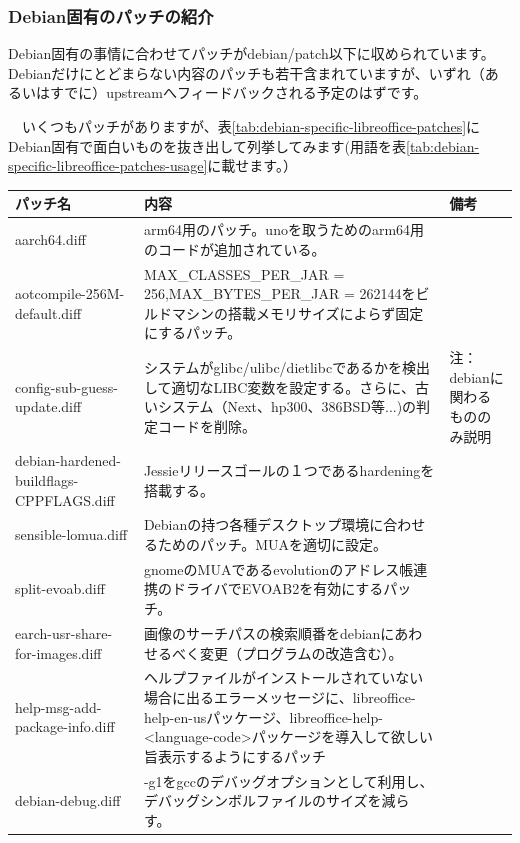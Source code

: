 \documentclass[mingoth,a4paper]{jsarticle}
\begin{document}
\subsubsection{Debian固有のパッチの紹介}

 Debian固有の事情に合わせてパッチがdebian/patch以下に収められています。Debianだけにとどまらない内容のパッチも若干含まれていますが、いずれ（あるいはすでに）upstreamへフィードバックされる予定のはずです。

　いくつもパッチがありますが、表\ref{tab:debian-specific-libreoffice-patches}にDebian固有で面白いものを抜き出して列挙してみます(用語を表\ref{tab:debian-specific-libreoffice-patches-usage}に載せます。）

\begin{table}[ht!]
\begin{center}
{\small{
\begin{tabular}{|l|p{7cm}|p{3cm}|}
\hline
パッチ名 & 内容 & 備考 \\ \hline \hline
aarch64.diff & arm64用のパッチ。unoを取うためのarm64用のコードが追加されている。& \\ \hline
aotcompile-256M-default.diff & MAX\_CLASSES\_PER\_JAR = 256,MAX\_BYTES\_PER\_JAR = 262144をビルドマシンの搭載メモリサイズによらず固定にするパッチ。& \\ \hline
config-sub-guess-update.diff & システムがglibc/ulibc/dietlibcであるかを検出して適切なLIBC変数を設定する。さらに、古いシステム（Next、hp300、386BSD等...)の判定コードを削除。& 注：debianに関わるもののみ説明 \\ \hline
debian-hardened-buildflags-CPPFLAGS.diff & Jessieリリースゴールの１つであるhardeningを搭載する。 & \\ \hline
sensible-lomua.diff & Debianの持つ各種デスクトップ環境に合わせるためのパッチ。MUAを適切に設定。& \\ \hline
split-evoab.diff & gnomeのMUAであるevolutionのアドレス帳連携のドライバでEVOAB2を有効にするパッチ。& \\ \hline
earch-usr-share-for-images.diff & 画像のサーチパスの検索順番をdebianにあわせるべく変更（プログラムの改造含む）。& \\ \hline
help-msg-add-package-info.diff & ヘルプファイルがインストールされていない場合に出るエラーメッセージに、libreoffice-help-en-usパッケージ、libreoffice-help-<language-code>パッケージを導入して欲しい旨表示するようにするパッチ & \\ \hline
debian-debug.diff & -g1をgccのデバッグオプションとして利用し、デバッグシンボルファイルのサイズを減らす。& \\ \hline

\end{tabular}}}
\end{center}
\end{table}
\end{document}
